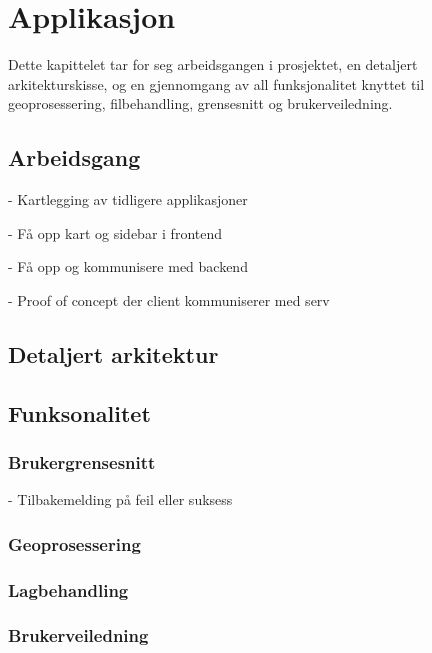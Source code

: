 \chapter{Applikasjon}

Dette kapittelet tar for seg arbeidsgangen i prosjektet, en detaljert arkitekturskisse, og en gjennomgang av all funksjonalitet knyttet til geoprosessering, filbehandling, grensesnitt og brukerveiledning. 

\section{Arbeidsgang}

- Kartlegging av tidligere applikasjoner

- Få opp kart og sidebar i frontend

- Få opp og kommunisere med backend

- Proof of concept der client kommuniserer med serv

\section{Detaljert arkitektur}

\section{Funksonalitet}

\subsection{Brukergrensesnitt}

- Tilbakemelding på feil eller suksess

\subsection{Geoprosessering}

\subsection{Lagbehandling}

\subsection{Brukerveiledning}

\cite{Johanessen}
